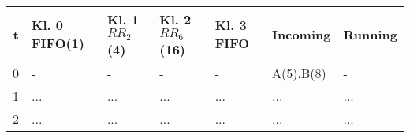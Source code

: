 \begin{tabular}{r|l|l|l|l|l|l}
 t      & Kl. 0 FIFO(1)   & Kl. 1 $RR_2$(4)               & Kl. 2 $RR_6$(16)  & Kl. 3 FIFO      & Incoming & Running   \\
 \hline
 0      & -             & -                         & -             & -             &  A(5),B(8)   &  -      \\
 1      & ...           & ...                       & ...           & ...           & ... & ...               \\
 2      & ...           & ...                       & ...           & ...           & ... & ...               \\
\end{tabular} 